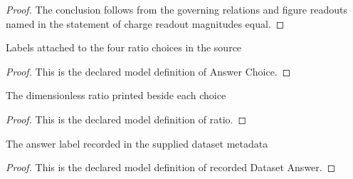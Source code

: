 \begin{proof}
  The conclusion follows from the governing relations and figure readouts named in the statement of charge readout magnitudes equal.
\end{proof}
\begin{definition}
  \label{def:physics:phyx-mini-0862:phyxminiproblems-problemphyxmini0862-answerchoice}
  Labels attached to the four ratio choices in the source
\end{definition}
\begin{proof}
  This is the declared model definition of Answer Choice.
\end{proof}
\begin{definition}[ratio]
  \label{def:physics:phyx-mini-0862:phyxminiproblems-problemphyxmini0862-answerchoice-ratio}
  The dimensionless ratio printed beside each choice
\end{definition}
\begin{proof}
  This is the declared model definition of ratio.
\end{proof}
\begin{definition}
  \label{def:physics:phyx-mini-0862:phyxminiproblems-problemphyxmini0862-recordeddatasetanswer}
  The answer label recorded in the supplied dataset metadata
\end{definition}
\begin{proof}
  This is the declared model definition of recorded Dataset Answer.
\end{proof}
